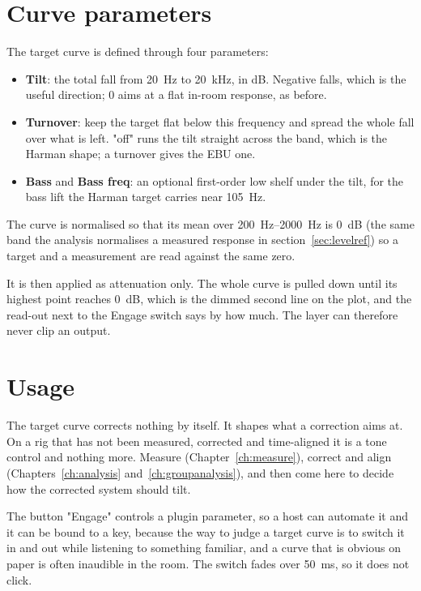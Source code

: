 \section{Curve parameters}\label{sec:targetshape}
The target curve is defined through four parameters:
\begin{itemize}[nosep]
  \item \textbf{Tilt}: the total fall from \SI{20}{\hertz} to \SI{20}{\kilo\hertz}, in dB. Negative falls, which is the useful direction; 0 aims at a flat in-room response, as before.
  \item \textbf{Turnover}: keep the target flat below this frequency and spread the whole fall over what is left. "off" runs the tilt straight across the band, which is the Harman shape; a turnover gives the EBU one.
  \item \textbf{Bass} and \textbf{Bass freq}: an optional first-order low shelf under the tilt, for the bass lift the Harman target carries near \SI{105}{\hertz}.
\end{itemize}

\noindent The curve is normalised so that its mean over \SIrange{200}{2000}{\hertz} is \SI{0}{\dB} (the same band the analysis normalises a measured response in section~\ref{sec:levelref}) so a target and a measurement are read against the same zero.

It is then applied as attenuation only. The whole curve is pulled down until its highest point reaches \SI{0}{\dB}, which is the dimmed second line on the plot, and the read-out next to the Engage switch says by how much. The layer can therefore never clip an output.

\section{Usage}\label{sec:targetuse}
The target curve corrects nothing by itself. It shapes what a correction aims at. On a rig that has not been measured, corrected and time-aligned it is a tone control and nothing more. Measure (Chapter~\ref{ch:measure}), correct and align (Chapters~\ref{ch:analysis} and~\ref{ch:groupanalysis}), and then come here to decide how the corrected system should tilt.

The button "Engage" controls a plugin parameter, so a host can automate it and it can be bound to a key, because the way to judge a target curve is to switch it in and out while listening to something familiar, and a curve that is obvious on paper is often inaudible in the room. The switch fades over \SI{50}{\milli\second}, so it does not click.

